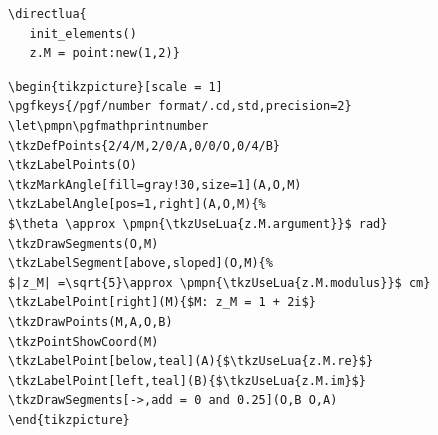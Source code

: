 \hspace*{\fill}

\begin{Verbatim}
\directlua{
   init_elements()
   z.M = point:new(1,2)}
\end{Verbatim}
\let\pmpn\pgfmathprintnumber
\DeleteShortVerb{\|}

\begin{Verbatim}
\begin{tikzpicture}[scale = 1]
\pgfkeys{/pgf/number format/.cd,std,precision=2}
\let\pmpn\pgfmathprintnumber
\tkzDefPoints{2/4/M,2/0/A,0/0/O,0/4/B}
\tkzLabelPoints(O)
\tkzMarkAngle[fill=gray!30,size=1](A,O,M)
\tkzLabelAngle[pos=1,right](A,O,M){%
$\theta \approx \pmpn{\tkzUseLua{z.M.argument}}$ rad}
\tkzDrawSegments(O,M)
\tkzLabelSegment[above,sloped](O,M){%
$|z_M| =\sqrt{5}\approx \pmpn{\tkzUseLua{z.M.modulus}}$ cm}
\tkzLabelPoint[right](M){$M: z_M = 1 + 2i$}
\tkzDrawPoints(M,A,O,B)
\tkzPointShowCoord(M)
\tkzLabelPoint[below,teal](A){$\tkzUseLua{z.M.re}$}
\tkzLabelPoint[left,teal](B){$\tkzUseLua{z.M.im}$}
\tkzDrawSegments[->,add = 0 and 0.25](O,B O,A)
\end{tikzpicture}
\end{Verbatim}


